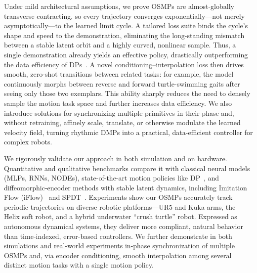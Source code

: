 Under mild architectural assumptions, we prove \glspl{OSMP} are almost-globally transverse contracting, so every trajectory converges exponentially—not merely asymptotically—to the learned limit cycle. A tailored loss suite binds the cycle’s shape and speed to the demonstration, eliminating the long-standing mismatch between a stable latent orbit and a highly curved, nonlinear sample. Thus, a single demonstration already yields an effective policy, drastically outperforming the data efficiency of DPs~\citep{chi2023diffusion}. 
A novel conditioning–interpolation loss then drives smooth, zero-shot transitions between related tasks: for example, the model continuously morphs between reverse and forward turtle-swimming gaits after seeing only those two exemplars. This ability sharply reduces the need to densely sample the motion task space and further increases data efficiency. 
We also introduce solutions for synchronizing multiple primitives in their phase and, without retraining, affinely scale, translate, or otherwise modulate the learned velocity field, turning rhythmic \glspl{DMP} into a practical, data-efficient controller for complex robots.

We rigorously validate our approach in both simulation and on hardware. Quantitative and qualitative benchmarks compare it with classical neural models (\glspl{MLP}, \glspl{RNN}, \glspl{NODE}), state-of-the-art motion policies like \gls{DP}~\citep{chi2023diffusion}, and diffeomorphic-encoder methods with stable latent dynamics, including Imitation Flow (iFlow)~\citep{urain2020imitationflow} and \gls{SPDT}~\citep{zhi2024teaching}. Experiments show our \glspl{OSMP} accurately track periodic trajectories on diverse robotic platforms—UR5 and Kuka arms, the Helix soft robot, and a hybrid underwater “crush turtle” robot. Expressed as autonomous dynamical systems, they deliver more compliant, natural behavior than time-indexed, error-based controllers. We further demonstrate in both simulations and real-world experiments in-phase synchronization of multiple \glspl{OSMP} and, via encoder conditioning, smooth interpolation among several distinct motion tasks with a single motion policy.

